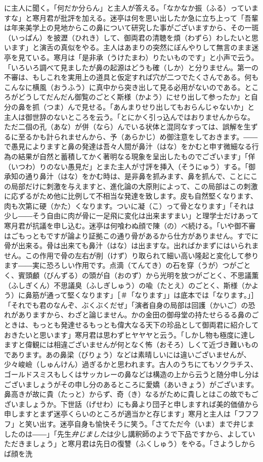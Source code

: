 \documentclass{book}
\begin{document}
に主人に聞く。「何だか分らん」と主人が答える。「なかなか振（ふる）っていますな」と寒月君が批評を加える。迷亭は何を思い出したか急に立ち上って「吾輩は年来美学上の見地からこの鼻について研究した事がございますから、その一斑（いっぱん）を披瀝（ひれき）して、御両君の清聴を煩（わずら）わしたいと思います」と演舌の真似をやる。主人はあまりの突然にぼんやりして無言のまま迷亭を見ている。寒月は「是非承（うけたまわ）りたいものです」と小声で云う。「いろいろ調べて見ましたが鼻の起源はどうも確（しか）と分りません。第一の不審は、もしこれを実用上の道具と仮定すれば穴が二つでたくさんである。何もこんなに横風（おうふう）に真中から突き出して見る必用がないのである。ところがどうしてだんだん御覧のごとく斯様（かよう）にせり出して参ったか」と自分の鼻を抓（つま）んで見せる。「あんまりせり出してもおらんじゃないか」と主人は御世辞のないところを云う。「とにかく引っ込んではおりませんからな。ただ二個の孔（あな）が併（なら）んでいる状体と混同なすっては、誤解を生ずるに至るかも計られませんから、予（あらかじ）め御注意をしておきます。――で愚見によりますと鼻の発達は吾々人間が鼻汁（はな）をかむと申す微細なる行為の結果が自然と蓄積してかく著明なる現象を呈出したものでございます」「佯（いつわ）りのない愚見だ」とまた主人が寸評を挿入（そうにゅう）する。「御承知の通り鼻汁（はな）をかむ時は、是非鼻を抓みます、鼻を抓んで、ことにこの局部だけに刺激を与えますと、進化論の大原則によって、この局部はこの刺激に応ずるがため他に比例して不相当な発達を致します。皮も自然堅くなります、肉も次第に硬（かた）くなります。ついに凝（こ）って骨となります」「それは少し――そう自由に肉が骨に一足飛に変化は出来ますまい」と理学士だけあって寒月君が抗議を申し込む。迷亭は何喰わぬ顔で陳（の）べ続ける。「いや御不審はごもっともですが論より証拠この通り骨があるから仕方がありません。すでに骨が出来る。骨は出来ても鼻汁（はな）は出ますな。出ればかまずにはいられません。この作用で骨の左右が削（けず）り取られて細い高い隆起と変化して参ります――実に恐ろしい作用です。点滴（てんてき）の石を穿（うが）つがごとく、賓頭顱（びんずる）の頭が自（おのず）から光明を放つがごとく、不思議薫（ふしぎくん）不思議臭（ふしぎしゅう）の喩（たとえ）のごとく、斯様（かよう）に鼻筋が通って堅くなります」{［＃「なります」」は底本では「なります。」］}「それでも君のなんぞ、ぶくぶくだぜ」「演者自身の局部は回護（かいご）の恐れがありますから、わざと論じません。かの金田の御母堂の持たせらるる鼻のごときは、もっとも発達せるもっとも偉大なる天下の珍品として御両君に紹介しておきたいと思います」寒月君は思わずヒヤヤヤと云う。「しかし物も極度に達しますと偉観には相違ございませんが何となく怖（おそろ）しくて近づき難いものであります。あの鼻梁（びりょう）などは素晴しいには違いございませんが、少々峻嶮（しゅんけん）過ぎるかと思われます。古人のうちにてもソクラチス、ゴールドスミスもしくはサッカレーの鼻などは構造の上から云うと随分申し分はございましょうがその申し分のあるところに愛嬌（あいきょう）がございます。鼻高きが故に貴（たっと）からず、奇（き）なるがために貴しとはこの故でもございましょうか。下世話（げせわ）にも鼻より団子と申しますれば美的価値から申しますとまず迷亭くらいのところが適当かと存じます」寒月と主人は「フフフフ」と笑い出す。迷亭自身も愉快そうに笑う。「さてただ今（いま）まで弁じましたのは――」「先生\emph{弁じました}は少し講釈師のようで下品ですから、よしていただきましょう」と寒月君は先日の復讐（ふくしゅう）をやる。「さようしからば顔を洗
\end{document}
